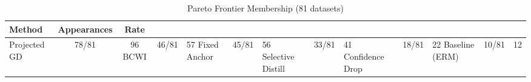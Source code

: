 \begin{table}[t]
\centering
\caption{Pareto Frontier Membership (81 datasets)}
\label{tab:pareto-frontier}
\begin{tabular}{lcc}
\toprule
Method & Appearances & Rate \\
\midrule
Projected GD & 78/81 & 96%
BCWI & 46/81 & 57%
Fixed Anchor & 45/81 & 56%
Selective Distill & 33/81 & 41%
Confidence Drop & 18/81 & 22%
Baseline (ERM) & 10/81 & 12%
\bottomrule
\end{tabular}
\end{table}